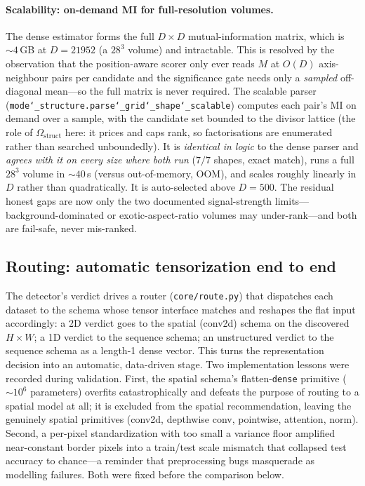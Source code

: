 \documentclass[11pt]{article}
\newcommand{\allowbreakhere}{\discretionary{}{}{}}
\newcommand{\code}[1]{\texttt{\def\_{\char`_\allowbreakhere}#1}}
\begin{document}
\paragraph{Scalability: on-demand MI for full-resolution volumes.} The dense estimator forms the full
$D\times D$ mutual-information matrix, which is ${\sim}4$\,GB at $D=21952$ (a $28^3$ volume) and
intractable. This is resolved by the observation that the position-aware scorer only ever reads $M$ at
$O(D)$ axis-neighbour pairs per candidate and the significance gate needs only a \emph{sampled}
off-diagonal mean---so the full matrix is never required. The scalable parser
(\code{mode\_structure.parse\_grid\_shape\_scalable}) computes each pair's MI on demand over a sample,
with the candidate set bounded to the divisor lattice (the role of $\Omega_{\mathrm{struct}}$ here: it
prices and caps rank, so factorisations are enumerated rather than searched unboundedly). It is
\emph{identical in logic} to the dense parser and \emph{agrees with it on every size where both run}
($7/7$ shapes, exact match), runs a full $28^3$ volume in ${\sim}40$\,s (versus out-of-memory, OOM), and scales roughly
linearly in $D$ rather than quadratically. It is auto-selected above $D=500$. The residual honest gaps
are now only the two documented signal-strength limits---background-dominated or exotic-aspect-ratio
volumes may under-rank---and both are fail-safe, never mis-ranked.


\subsection{Routing: automatic tensorization end to end}
\label{sec:routing}

The detector's verdict drives a router (\code{core/route.py}) that dispatches each dataset to the
schema whose tensor interface matches and reshapes the flat input accordingly: a 2D verdict goes
to the spatial (conv2d) schema on the discovered $H\times W$; a 1D verdict to the sequence
schema; an unstructured verdict to the sequence schema as a length-1 dense vector. This turns
the representation decision into an automatic, data-driven stage. Two implementation lessons were
recorded during validation. First, the spatial schema's flatten-\code{dense} primitive
($\sim\!10^6$ parameters) overfits catastrophically and defeats the purpose of routing to a spatial
model at all; it is excluded from the spatial recommendation, leaving the genuinely spatial
primitives (conv2d, depthwise conv, pointwise, attention, norm). Second, a per-pixel standardization
with too small a variance floor amplified near-constant border pixels into a train/test scale
mismatch that collapsed test accuracy to chance---a reminder that preprocessing bugs masquerade as
modelling failures. Both were fixed before the comparison below.
\end{document}
